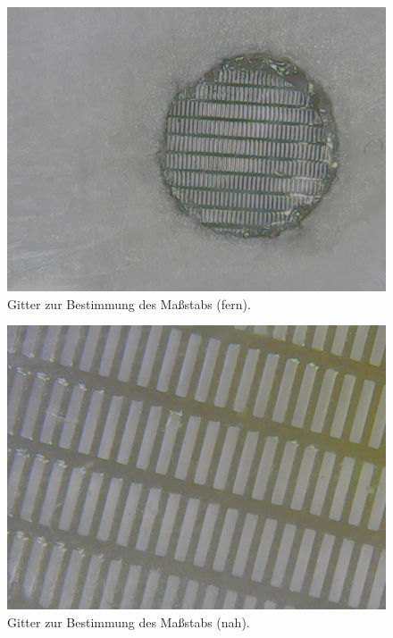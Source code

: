 \documentclass[sn-mathphys-num,iicol]{sn-jnl}
\theoremstyle{thmstyleone}
\theoremstyle{thmstyletwo}
\theoremstyle{thmstylethree}
\begin{document}
\begin{figure}[h]
  \centering
  \includegraphics[width=.5\textwidth]{../data/gold_1_norm.png}
  \caption{Gitter zur Bestimmung des Maßstabs (fern).} \label{fig:gitter_fern}
\end{figure}
\begin{figure}[h]
  \centering
  \includegraphics[width=.5\textwidth]{../data/gold_3_norm.png}
  \caption{Gitter zur Bestimmung des Maßstabs (nah).} \label{fig:gitter_nah}
\end{figure}
\end{document}
